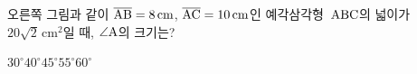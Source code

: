 \noindent\begin{minipage}[t]{0.58\linewidth}\vspace{0pt}\raggedright 오른쪽 그림과 같이 $\overline{\mathrm{AB}}=8\,\mathrm{cm}$, $\overline{\mathrm{AC}}=10\,\mathrm{cm}$인 예각삼각형~$\mathrm{ABC}$의 넓이가 $20\sqrt{2}\,\mathrm{cm}^2$일 때, $\angle\mathrm{A}$의 크기는?\end{minipage}\hfill\begin{minipage}[t]{0.4\linewidth}\vspace{0pt}\centering \resizebox{\ifdim\width>\linewidth\linewidth\else\width\fi}{!}{}\end{minipage}\par
\begin{choicesii}{$30^\circ$}{$40^\circ$}{$45^\circ$}{$55^\circ$}{$60^\circ$}\end{choicesii}
